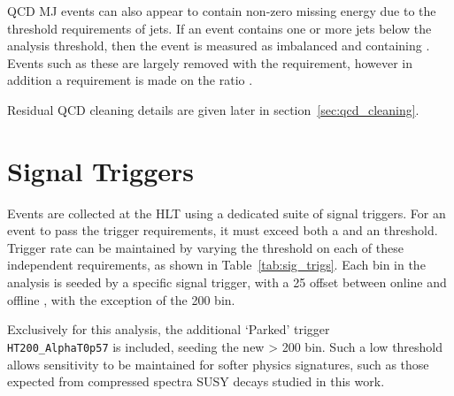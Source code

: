 QCD MJ events can also appear to contain non-zero missing energy 
due to the threshold requirements of jets. If an event contains 
one or more jets below the analysis threshold, then the 
event is measured as imbalanced and containing \mht. Events such as these are largely 
removed with the \alphat requirement, however in addition a requirement is made on the
ratio \mhtmet.

Residual QCD cleaning details are given later in section~\ref{sec:qcd_cleaning}.



\section{Signal Triggers}

Events are collected at the HLT using a dedicated suite of
signal triggers. For an event to pass the trigger
requirements, it must exceed both a \HT and an \alphat threshold. Trigger rate 
can be maintained by varying the
threshold on each of these independent requirements, as shown in
Table~\ref{tab:sig_trigs}. Each \HT bin in the analysis is seeded by a
specific signal
trigger, with a 25 \gev offset between online and offline \HT, with the
exception of the 200 \gev bin.

Exclusively for this analysis, the additional `Parked' trigger 
\\\verb!HT200_AlphaT0p57! is included, seeding the new \HT> 200 \gev bin. Such a low
threshold allows sensitivity to be maintained for softer physics signatures, such
as those expected from compressed spectra SUSY decays studied in this work.

